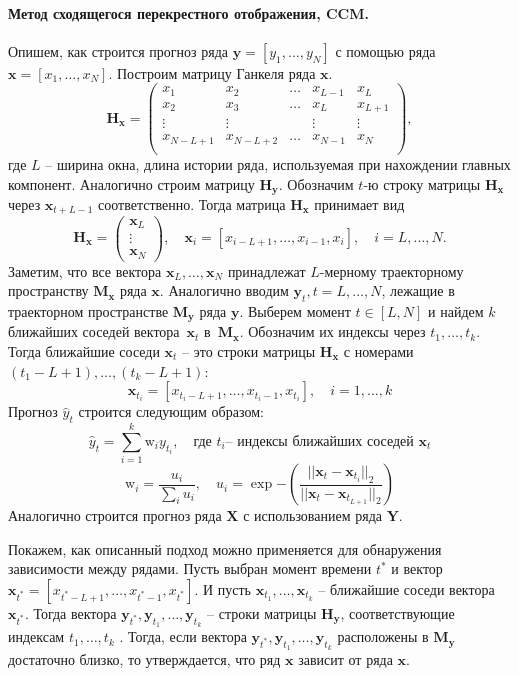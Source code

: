 \documentclass[14pt]{article}
\newcommand{\bH}{\mathbf{H}}
\newcommand{\bM}{\mathbf{M}}
\newcommand{\bx}{\mathbf{x}}
\newcommand{\by}{\mathbf{y}}
\begin{document}
\paragraph{Метод сходящегося перекрестного отображения, CCM.}
Опишем, как строится прогноз ряда $\by = \left[y_1, \ldots, y_N\right]$ с помощью ряда $\bx = \left[x_1, \ldots, x_N\right]$. 
Построим матрицу Ганкеля ряда $\bx$.
$$\mathbf{H}_{\bx} = \begin{pmatrix}
x_1 & x_2 & \ldots & x_{L - 1} & x_{L} \\ 
x_2 & x_3 & \ldots & x_{L} & x_{L + 1} \\ 
\vdots & \vdots & & \vdots  & \vdots\\ 
x_{N - L + 1} & x_{N - L + 2} & \ldots & x_{N - 1} & x_{N} \\ 
\end{pmatrix},$$
где $L$ -- ширина окна, длина истории ряда, используемая при нахождении главных компонент. Аналогично строим матрицу $\bH_{\by}$. 
Обозначим $t$-ю строку матрицы $\bH_{\bx}$ через $\bx_{t + L - 1}$ соответственно. Тогда матрица $\bH_{\bx}$ принимает вид 
$$\bH_{\bx} = \begin{pmatrix}
\bx_{L} \\ \vdots \\ \bx_{N}
\end{pmatrix}, \quad \bx_{i} = \left[x_{i - L + 1}, \ldots, x_{i - 1}, x_{i}\right], \quad i = L, \ldots, N.$$ 
Заметим, что все вектора $\bx_L, \ldots, \bx_N$ принадлежат $L$-мерному траекторному пространству $\bM_{\bx}$ ряда $\bx$. 
Аналогично вводим $\by_{t}, t = L, \ldots, N$, лежащие в траекторном пространстве $\bM_{\by}$ ряда $\by$.
Выберем момент $t \in [L, N]$ и найдем $k$  ближайших соседей вектора~$\mathbf{x}_t$ в~$\bM_{\bx}$. Обозначим их индексы через ${t_1}, \ldots, {t_{k}}$. Тогда ближайшие соседи $\mathbf{x}_{t}$ -- это строки матрицы $\bH_{\bx}$ с номерами \mbox{$(t_1 - L + 1), \ldots,(t_{k} - L + 1)$}:
$$\bx_{t_i} = \left[x_{t_{i} - L + 1}, \ldots, x_{t_{i} - 1}, x_{t_i} \right], \quad i = 1 , \ldots, k$$
Прогноз $\hat{y}_t$ строится следующим образом:
$$\hat{y}_t = \sum_{i = 1}^{k}{\text{w}_i y_{t_i}}, \quad  \text{где } t_i \text{-- индексы ближайших соседей } \mathbf{x}_{t}$$
$$\text{w}_i = \frac{u_i}{\sum_{i}u_i}, \quad u_i = \exp{-\left( \dfrac{||\mathbf{x}_t - \mathbf{x}_{t_i}||_2}{||\mathbf{x}_t - \mathbf{x}_{t_{L + 1}}||_2}\right)}$$
Аналогично строится прогноз ряда $\mathbf{X}$ с использованием ряда $\mathbf{Y}$.

Покажем, как описанный подход можно применяется для обнаружения зависимости между рядами. Пусть выбран момент времени $t^*$ и вектор $\bx_{t^*} = \left[x_{t^* - L + 1}, \ldots, x_{t^* - 1}, x_{t^*} \right]$. И пусть $\bx_{t_1}, \ldots, \bx_{t_k}$ -- ближайшие соседи вектора $\bx_{t^*}$. Тогда вектора $\by_{t^*}, \by_{t_1}, \ldots, \by_{t_k}$ -- строки матрицы $\bH_{\by}$, соответствующие индексам $t_1, \ldots, t_k$ . Тогда, если вектора $\by_{t^*}, \by_{t_1}, \ldots, \by_{t_k}$ расположены в $\bM_{\by}$ достаточно близко, то утверждается, что ряд $\bx$ зависит от ряда $\bx$.
\end{document}
